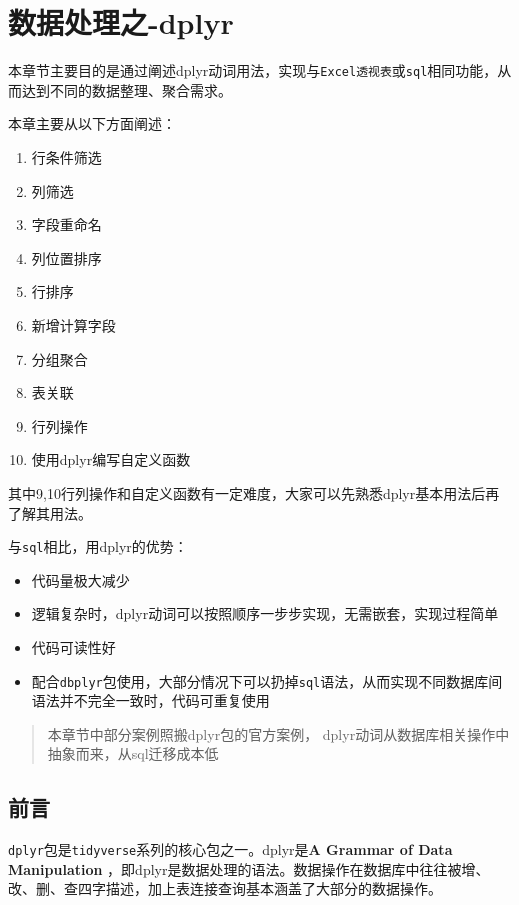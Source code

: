 \documentclass[
]{book}
\providecommand{\tightlist}{%
  \setlength{\itemsep}{0pt}\setlength{\parskip}{0pt}}
\begin{document}
\hypertarget{Data:Manipulation-dplyr}{%
\chapter{数据处理之-dplyr}\label{Data:Manipulation-dplyr}}

本章节主要目的是通过阐述dplyr动词用法，实现与\texttt{Excel透视表}或\texttt{sql}相同功能，从而达到不同的数据整理、聚合需求。

本章主要从以下方面阐述：

\begin{enumerate}
\def\labelenumi{\arabic{enumi}.}
\tightlist
\item
  行条件筛选
\item
  列筛选
\item
  字段重命名
\item
  列位置排序
\item
  行排序
\item
  新增计算字段
\item
  分组聚合
\item
  表关联
\item
  行列操作
\item
  使用dplyr编写自定义函数
\end{enumerate}

其中9,10行列操作和自定义函数有一定难度，大家可以先熟悉dplyr基本用法后再了解其用法。

与\texttt{sql}相比，用dplyr的优势：

\begin{itemize}
\item
  代码量极大减少
\item
  逻辑复杂时，dplyr动词可以按照顺序一步步实现，无需嵌套，实现过程简单
\item
  代码可读性好
\item
  配合\texttt{dbplyr}包使用，大部分情况下可以扔掉\texttt{sql}语法，从而实现不同数据库间语法并不完全一致时，代码可重复使用
\end{itemize}

\begin{quote}
本章节中部分案例照搬dplyr包的官方案例，
dplyr动词从数据库相关操作中抽象而来，从sql迁移成本低
\end{quote}

\hypertarget{dplyr:description}{%
\section{前言}\label{dplyr:description}}

\texttt{dplyr}包是\texttt{tidyverse}系列的核心包之一。dplyr是\textbf{A Grammar of Data Manipulation }，即dplyr是数据处理的语法。数据操作在数据库中往往被增、改、删、查四字描述，加上表连接查询基本涵盖了大部分的数据操作。
\end{document}
